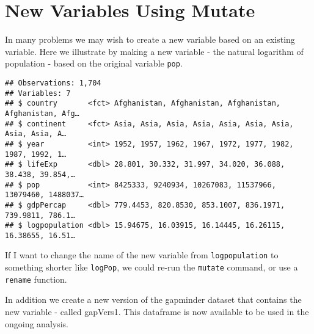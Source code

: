 \documentclass[]{book}
\newenvironment{Shaded}{\begin{snugshade}}{\end{snugshade}}
\newcommand{\KeywordTok}[1]{\textcolor[rgb]{0.13,0.29,0.53}{\textbf{#1}}}
\newcommand{\DataTypeTok}[1]{\textcolor[rgb]{0.13,0.29,0.53}{#1}}
\newcommand{\StringTok}[1]{\textcolor[rgb]{0.31,0.60,0.02}{#1}}
\newcommand{\CommentTok}[1]{\textcolor[rgb]{0.56,0.35,0.01}{\textit{#1}}}
\newcommand{\OperatorTok}[1]{\textcolor[rgb]{0.81,0.36,0.00}{\textbf{#1}}}
\newcommand{\NormalTok}[1]{#1}
\begin{document}
\section{New Variables Using Mutate}\label{new-variables-using-mutate}

In many problems we may wish to create a new variable based on an
existing variable. Here we illustrate by making a new variable - the
natural logarithm of population - based on the original variable
\texttt{pop}.

\begin{Shaded}
\end{Shaded}

\begin{verbatim}
## Observations: 1,704
## Variables: 7
## $ country       <fct> Afghanistan, Afghanistan, Afghanistan, Afghanistan, Afg…
## $ continent     <fct> Asia, Asia, Asia, Asia, Asia, Asia, Asia, Asia, Asia, A…
## $ year          <int> 1952, 1957, 1962, 1967, 1972, 1977, 1982, 1987, 1992, 1…
## $ lifeExp       <dbl> 28.801, 30.332, 31.997, 34.020, 36.088, 38.438, 39.854,…
## $ pop           <int> 8425333, 9240934, 10267083, 11537966, 13079460, 1488037…
## $ gdpPercap     <dbl> 779.4453, 820.8530, 853.1007, 836.1971, 739.9811, 786.1…
## $ logpopulation <dbl> 15.94675, 16.03915, 16.14445, 16.26115, 16.38655, 16.51…
\end{verbatim}

If I want to change the name of the new variable from
\texttt{logpopulation} to something shorter like \texttt{logPop}, we
could re-run the \texttt{mutate} command, or use a \texttt{rename}
function.

In addition we create a new version of the gapminder dataset that
contains the new variable - called gapVers1. This dataframe is now
available to be used in the ongoing analysis.

\begin{Shaded}
\end{Shaded}
\end{document}
